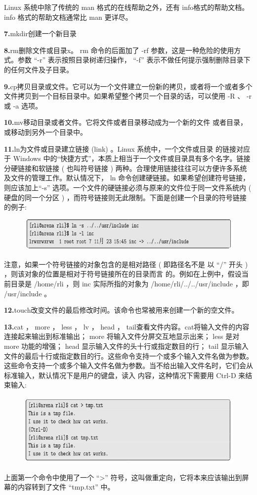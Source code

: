 \documentclass[12pt，a4paper]{article}
\numberwithin{equation}{section}
\begin{document}
Linux 系统中除了传统的 man 格式的在线帮助之外，还有 info格式的帮助文档。 info 格式的帮助文档通常比 man 更详尽。

\textbf{7.}mkdir创建一个新目录

\textbf{8.}rm删除文件或目录x。
rm 命令的后面加了 -rf 参数，这是一种危险的使用方式。参数 “-r” 表示按照目录树递归操作， “-f” 表示不做任何提示强制删除目录下的任何文件及子目录。

\textbf{9.}cp拷贝目录或文件。它可以为一个文件建立一份新的拷贝，或者将一个或者多个文件拷贝到一个目标目录中。如果希望整个拷贝一个目录的话，可以使用 -R 、 -r 或 -a 选项。

\textbf{10.}mv移动目录或者文件。它将文件或者目录移动成为一个新的文件
或者目录，或移动到另外一个目录中。

\textbf{11.}ln为文件或目录建立链接 (link) 。Linux 系统中，一个文件或目录
的链接对应于 Windows 中的“快捷方式”，本质上相当于一个文件或目录具有多个名字。链接分硬链接和软链接 ( 也叫符号链接 ) 两种。合理使用链接往往可以方便许多系统及文件的管理工作。默认情况下， ln 命令创建硬链接。如果希望创建符号链接，则应该加上“-s” 选项。一个文件的硬链接必须与原来的文件位于同一文件系统内 ( 硬盘的同一个分区 ) ，而符号链接则无此限制。下面是创建一个目录的符号链接的例子:
\begin{figure}[H]
\centering
\includegraphics[scale=0.6]{./figures/221.png}
\end{figure}
注意，如果一个符号链接的对象包含的是相对路径 ( 即路径名不是
以 “/” 开头 ) ，则该对象的位置是相对于符号链接所在的目录而言
的。例如在上例中，假设当前目录是 /home/rli ，则 inc 实际所指的对象为 /home/rli/../../usr/include ，即 /usr/include 。

\textbf{12.}touch改变文件的最后修改时间。该命令也常被用来创建一个新的空文件。

\textbf{13.}cat ， more ， less ， lv ， head ， tail查看文件内容。cat将输入文件的内容连接起来输出到标准输出； more 将输入文件分屏交互地显示出来； less 是对 more 功能的增强； head 显示输入文件的头十行或指定数目的行； tail 显示输入文件的最后十行或指定数目的行。这些命令支持一个或多个输入文件名做为参数。这些命令支持一个或多个输入文件名做为参数。当不给出输入文件名时，它们会从标准输入，默认情况下是用户的键盘，读入
内容，这种情况下需要用 Ctrl-D 来结束输入:
\begin{figure}[H]
\centering
\includegraphics[scale=0.6]{./figures/222.png}
\end{figure}
上面第一个命令中使用了一个 “>” 符号，这叫做重定向，它将本来应该输出到屏幕的内容转到了文件 “tmp.txt” 中。
\end{document}
